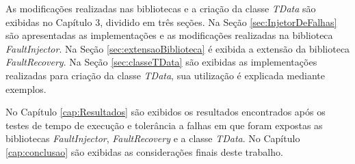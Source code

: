 As modificações realizadas nas bibliotecas e a criação da classe \textit{TData} são exibidas no Capítulo 3, dividido em três seções. Na Seção \ref{sec:InjetorDeFalhas} são apresentadas as implementações e as modificações realizadas na biblioteca \textit{FaultInjector}. Na Seção \ref{sec:extensaoBiblioteca} é exibida a extensão da biblioteca \textit{FaultRecovery}. Na Seção \ref{sec:classeTData} são exibidas as implementações realizadas para criação da classe \textit{TData}, sua utilização é explicada mediante exemplos.

No Capítulo \ref{cap:Resultados} são exibidos os resultados encontrados após os testes de tempo de execução e tolerância a falhas em que foram expostas as bibliotecas \textit{FaultInjector}, \textit{FaultRecovery} e a classe \textit{TData}. No Capítulo \ref{cap:conclusao} são exibidas as considerações finais deste trabalho.


